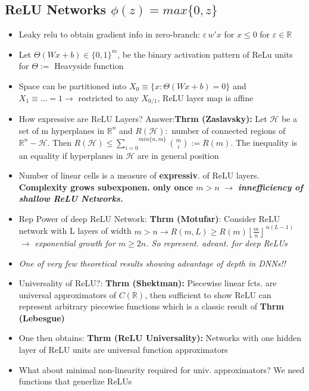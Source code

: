 \subsection{ReLU Networks \(\phi(z) = max\{0,z\}\) } 
\begin{itemize}
    \item Leaky relu to obtain gradient info in zero-branch: \( \varepsilon \, w' x\) for \(x \leq 0\) for \(\varepsilon \in \mathbb{R}\)
    \item Let \(\Theta(Wx+b) \in \{0,1\}^m\), be the binary activation pattern of ReLu units for \(\Theta :=\) Heavyside function
    \item Space can be partitioned into \(X_0 \equiv \{x: \Theta (Wx+b) =0\}\) and \(X_1 \equiv \dots =1 \rightarrow\) restricted to any \(X_{0/1}\), ReLU layer map is affine 
    \item How expressive are ReLU Layers? Answer:\textbf{Thrm (Zaslavsky):} Let \(\mathcal{H}\) be a set of m hyperplanes in \(\mathbb{R}^n\) and \(R(\mathcal{H}):\) number of connected regions of \(\mathbb{R}^n-\mathcal{H}\). Then \(R(\mathcal{H})\leq \overset{min\{n,m\}}{\underset{i=0}{\sum}}\binom{m}{i}:=R(m)\). The inequality is an equality if hyperplanes in \(\mathcal{H}\) are in general position
    \item Number of linear cells is a measure of \textbf{expressiv}. of ReLU layers. \textbf{Complexity grows subexponen. only once \(m>n\)} \(\rightarrow\) \textbf{\textit{innefficiency of shallow ReLU Networks.}}
    \item Rep Power of deep ReLU Network: \textbf{Thrm (Motufar)}: Consider ReLU network with L layers of width \(m>n\rightarrow R(m,L)\geq R(m) \left\lfloor \frac{m}{n} \right\rfloor^{\,n(L-1)}\) \(\rightarrow\) \textit{exponential growth for \(m\geq 2n\). So represent. advant. for deep ReLUs}
    \item \textit{One of very few theoretical results showing advantage of depth in DNNs!!}
    \item Universality of ReLU?: \textbf{Thrm (Shektman):} Piecewise linear fcts. are universal approximators of \(C(\mathbb{R})\), then sufficient to show ReLU can represent arbitrary piecewise functions which is a classic result of \textbf{Thrm (Lebesgue)}
    \item One then obtains: \textbf{Thrm (ReLU Universality):} Networks with one hidden layer of ReLU units are universal function approximators
    \item What about minimal non-linearity required for univ. approximators? We need functions that generlize ReLUs

\end{itemize}

